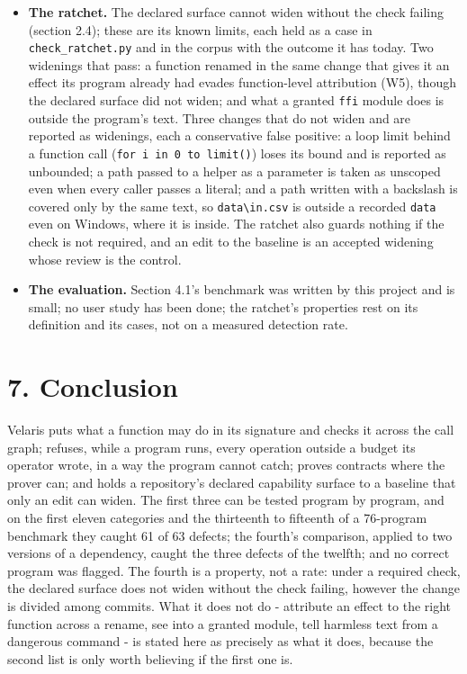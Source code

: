 \documentclass[
]{article}
\begin{document}
\begin{itemize}
  granted host name resolves, and what a granted host does with a
  request are outside the model.
\item
  \textbf{The ratchet.} The declared surface cannot widen without the
  check failing (section 2.4); these are its known limits, each held as
  a case in \texttt{check\_ratchet.py} and in the corpus with the
  outcome it has today. Two widenings that pass: a function renamed in
  the same change that gives it an effect its program already had evades
  function-level attribution (W5), though the declared surface did not
  widen; and what a granted \texttt{ffi} module does is outside the
  program's text. Three changes that do not widen and are reported as
  widenings, each a conservative false positive: a loop limit behind a
  function call (\texttt{for\ i\ in\ 0\ to\ limit()}) loses its bound
  and is reported as unbounded; a path passed to a helper as a parameter
  is taken as unscoped even when every caller passes a literal; and a
  path written with a backslash is covered only by the same text, so
  \texttt{data\textbackslash{}in.csv} is outside a recorded
  \texttt{data} even on Windows, where it is inside. The ratchet also
  guards nothing if the check is not required, and an edit to the
  baseline is an accepted widening whose review is the control.
\item
  \textbf{The evaluation.} Section 4.1's benchmark was written by this
  project and is small; no user study has been done; the ratchet's
  properties rest on its definition and its cases, not on a measured
  detection rate.
\end{itemize}

\section{7. Conclusion}\label{conclusion}

Velaris puts what a function may do in its signature and checks it
across the call graph; refuses, while a program runs, every operation
outside a budget its operator wrote, in a way the program cannot catch;
proves contracts where the prover can; and holds a repository's declared
capability surface to a baseline that only an edit can widen. The first
three can be tested program by program, and on the first eleven
categories and the thirteenth to fifteenth of a 76-program benchmark
they caught 61 of 63 defects; the fourth's comparison, applied to two
versions of a dependency, caught the three defects of the twelfth; and
no correct program was flagged. The fourth is a property, not a rate:
under a required check, the declared surface does not widen without the
check failing, however the change is divided among commits. What it does
not do - attribute an effect to the right function across a rename, see
into a granted module, tell harmless text from a dangerous command - is
stated here as precisely as what it does, because the second list is
only worth believing if the first one is.
\end{document}
